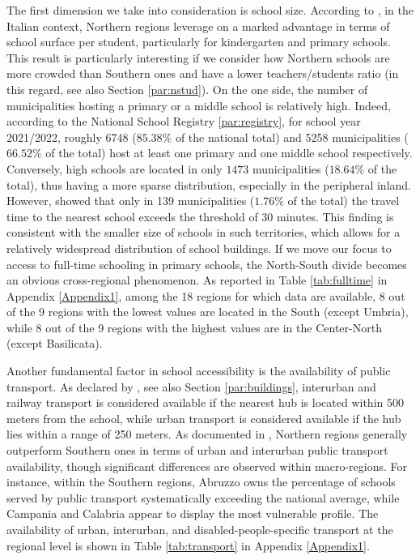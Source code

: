 \documentclass[openany]{book}
\begin{document}
The first dimension we take into consideration is school size. According to \cite{BDI}, in the Italian context, Northern regions leverage on a marked advantage in terms of school surface per student, particularly for kindergarten and primary schools. This result is particularly interesting if we consider how Northern schools are more crowded than Southern ones and have a lower teachers/students ratio (in this regard, see also Section \ref{par:nstud}). On the one side, the number of municipalities hosting a primary or a middle school is relatively high. Indeed, according to the National School Registry \ref{par:registry}, for school year 2021/2022, roughly 6748 ($85.38\%$ of the national total) and 5258 municipalities ($66.52\%$ of the total) host at least one primary and one middle school respectively. Conversely, high schools are located in only $1473$ municipalities ($18.64\%$ of the total), thus having a more sparse distribution, especially in the peripheral inland. However, \cite{BDI} showed that only in 139 municipalities ($1.76\%$ of the total) the travel time to the nearest school exceeds the threshold of 30 minutes. This finding is consistent with the smaller size of schools in such territories, which allows for a relatively widespread distribution of school buildings. If we move our focus to access to full-time schooling in primary schools, the North-South divide becomes an obvious cross-regional phenomenon. As reported in Table \ref{tab:fulltime} in Appendix \ref{Appendix1}, among the 18 regions for which data are available, 8 out of the 9 regions with the lowest values are located in the South (except Umbria), while 8 out of the 9 regions with the highest values are in the Center-North (except Basilicata).

Another fundamental factor in school accessibility is the availability of public transport. As declared by \cite{MIUR}, see also Section \ref{par:buildings}, interurban and railway transport is considered available if the nearest hub is located within 500 meters from the school, while urban transport is considered available if the hub lies within a range of 250 meters. As documented in \cite{Garlaschi}, Northern regions generally outperform Southern ones in terms of urban and interurban public transport availability, though significant differences are observed within macro-regions. For instance, within the Southern regions, Abruzzo owns the percentage of schools served by public transport systematically exceeding the national average, while Campania and Calabria appear to display the most vulnerable profile. The availability of urban, interurban, and disabled-people-specific transport at the regional level is shown in Table \ref{tab:transport} in Appendix \ref{Appendix1}.
\end{document}
